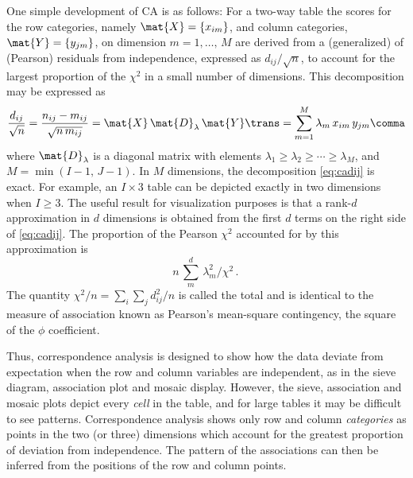\documentclass[11pt]{book}
\begin{document}
One simple development of CA is as follows:
For a two-way table the scores for the row categories, namely
\(\mat{X} = \{x_{im}\}\), and column categories, \(\mat{Y} = \{y_{jm}\}\), on dimension \(m = 1,
\dots , \,  M\) are derived from a (generalized)  of
(Pearson) residuals from independence, expressed as \(d_{ij} /  \sqrt n\), to
account for the largest proportion of the \(\chi^2\) in a small
number of dimensions.  This decomposition may be expressed as
%
\begin{equation} \label{eq:cadij}
  \frac{d_{ij}}{\sqrt{n}} = 
  \frac{n_{ij} - m_{ij}} {\sqrt {n \,  m_{ij}}} =
  \mat{X} \, \mat{D}_\lambda \, \mat{Y}\trans =
  \sum_{m=1}^M  \lambda_m \,  x_{im} \,  y_{jm}
  \comma
\end{equation}
where $\mat{D}_\lambda$ is a diagonal matrix with elements
\(\lambda_1 \geq \lambda_2 \geq \cdots \geq \lambda_M\), and \(M
=  \min ( I-1 , \,  J-1 )\).  In \(M\) dimensions, the decomposition
\eqref{eq:cadij} is exact.
For example, an \(I \times 3\) table can be depicted exactly
in two dimensions when $I \ge 3$.  The useful result for visualization
purposes is that
a rank-\(d\) approximation in \(d\) dimensions is
obtained from the first \(d\) terms on the right side of \eqref{eq:cadij}.
The proportion of the Pearson \(\chi^2\) accounted for by this approximation is
\begin{equation*}
 n \,  \sum_m^d { \,  \lambda_m^2 } \big/  \chi^2
 \period
\end{equation*}
The quantity $\chi^2 /n = \sum_i \sum_j d_{ij}^2  / n$ is called
the total  and is identical to the measure of
association known as Pearson's mean-square contingency, the
square of the $\phi$ coefficient.

Thus, correspondence analysis is designed to show how the data
deviate from expectation when the row and column variables are
independent, as in the sieve diagram, 
association plot and mosaic display.  However,
the sieve, association and mosaic plots depict every \emph{cell} in
the table, and for large tables it may be difficult to see patterns.
Correspondence analysis shows only row and column \emph{categories} 
as points in
the two (or three) dimensions which account for the greatest
proportion of deviation from independence.
The pattern of the associations can then be inferred from the positions of the
row and column points.
\end{document}
